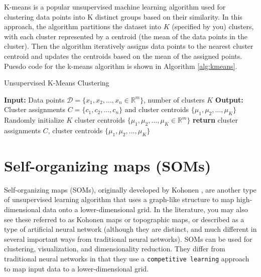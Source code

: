 \documentclass{article}[11pt]
\newcommand{\norm}[1]{\left|\left|#1\right|\right|}
\DeclareMathOperator*{\argmin}{arg\,min}
\begin{document}
K-means is a popular unsupervised machine learning algorithm used for clustering data points into K distinct groups based on their similarity.
In this approach, the algorithm partitions the dataset into $K$ (specified by you) clusters, 
with each cluster represented by a centroid (the mean of the data points in the cluster). 
Then the algorithm iteratively assigns data points to the nearest cluster centroid and updates the centroids based on the mean of the assigned points.
Puesdo code for the k-means algorithm is shown in Algorithm \ref{alg:kmeans}.

\begin{algorithm}[H]
   \begin{algorithmic}[1]
   \caption{Unsupervised K-Means Clustering}\label{alg:kmeans}
   \State \textbf{Input:} Data points $\mathcal{D} = \{x_1, x_2, \ldots, x_n\in\mathbb{R}^{m}\}$, number of clusters $K$
   \State \textbf{Output:} Cluster assignments $C = \{c_1, c_2, \ldots, c_n\}$ and cluster centroids $\{\mu_1, \mu_2, \ldots, \mu_K\}$
   \State Randomly initialize $K$ cluster centroids $\{\mu_1, \mu_2, \ldots, \mu_K\in\mathbb{R}^{m}\}$
      \State{$c_{i}\gets\underset{j}\argmin \norm{x_{i} - \mu_j}^2$}
   \EndFor 
   \State{$\hat{\mu}\gets\mu$}
   \EndFor
   \If{$\norm{\mu - \hat{\mu}} < \epsilon$}
   \EndIf
   \EndWhile
   \State \textbf{return} cluster assignments $C$, cluster centroids $\{\mu_1, \mu_2, \ldots, \mu_K\}$
   \end{algorithmic}
\end{algorithm}


\section{Self-organizing maps (SOMs)}
Self-organizing maps (SOMs), originally developed by Kohonen \citep{Kohonen:1982aa}, are another type of unsupervised learning algorithm that uses a graph-like structure to map high-dimensional data onto a lower-dimensional grid.
In the literature, you may also see these referred to as Kohonen maps or topographic maps, or described as a type of artificial neural network
(although they are distinct, and much different in several important ways from traditional neural networks).
SOMs can be used for clustering, visualization, and dimensionality reduction. 
They differ from traditional neural networks in that they use a \texttt{competitive learning} approach 
to map input data to a lower-dimensional grid.
\end{document}
